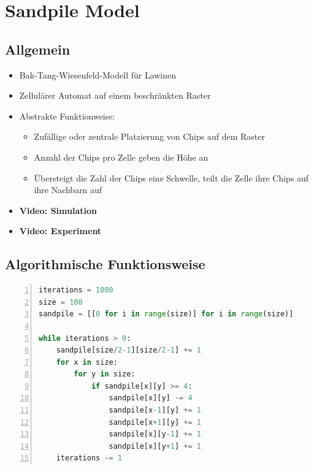 \documentclass{beamer}
\begin{document}
\section{Sandpile Model}
\subsection{Allgemein}
\begin{frame}{\insertsection}{\insertsubsection}
	\begin{itemize}
        \item Bak-Tang-Wiesenfeld-Modell für Lawinen
        \item Zellulärer Automat auf einem beschränkten Raster
        \pause
        \item Abstrakte Funktionweise:
            \pause
            \begin{itemize}
                \item Zufällige oder zentrale Platzierung von Chips auf dem Raster
                \pause
                \item Anzahl der Chips pro Zelle geben die Höhe an
                \pause
                \item Übersteigt die Zahl der Chips eine Schwelle, teilt die Zelle ihre Chips auf
                    ihre Nachbarn auf
            \end{itemize}
        \item \textbf{Video: Simulation}
        \item \textbf{Video: Experiment}
	\end{itemize}
\end{frame}

\subsection{Algorithmische Funktionsweise}
\begin{frame}[fragile]{\insertsection}{\insertsubsection}
    \footnotesize
    \begin{lstlisting}[language=Python,numbers=left]
iterations = 1000
size = 100
sandpile = [[0 for i in range(size)] for i in range(size)]

while iterations > 0:
    sandpile[size/2-1][size/2-1] += 1
    for x in size:
        for y in size:
            if sandpile[x][y] >= 4:
                sandpile[x][y] -= 4
                sandpile[x-1][y] += 1
                sandpile[x+1][y] += 1
                sandpile[x][y-1] += 1
                sandpile[x][y+1] += 1
    iterations -= 1
    \end{lstlisting}
\end{frame}
\end{document}
